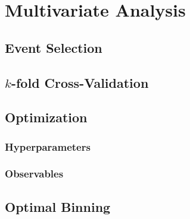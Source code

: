 \chapter{Multivariate Analysis}\label{cha:mva}


\section{Event Selection}\label{sec:mva:event_selection}


\section{$k$-fold Cross-Validation}\label{sec:mva:kfold-xval}




\section{Optimization}
\label{sec:mva:optimization}

\subsection{Hyperparameters}
\label{sub:mva:hyperparameters}

% 

\subsection{Observables}\label{sub:mva:input_variables}

\section{Optimal Binning}\label{sec:mva:binning}
